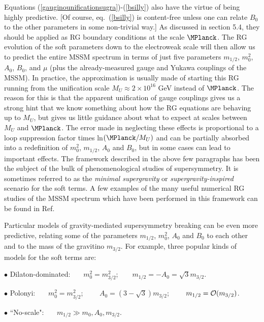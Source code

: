 Equations (\ref{gauginounificationsugra})-(\ref{bsilly})
also have the virtue of being highly predictive. [Of course,
eq.~(\ref{bsilly}) is content-free unless one can relate
$B_0$ to the other parameters in some non-trivial way.]
As discussed in section 5.4, they should be applied as RG boundary
conditions at the
scale $\MPlanck$. The RG evolution of the soft parameters
down to the electroweak scale
will then allow us to predict the entire MSSM
spectrum in terms
of just five parameters $m_{1/2}$, $m_0^2$, $A_0$, $B_0$, and
$\mu$ (plus the already-measured gauge and Yukawa couplings of the MSSM).
In practice, the approximation is usually made
of starting this RG running from
the unification scale $M_U\approx 2\times 10^{16}$ GeV
instead of $\MPlanck$. The reason for this
is that the apparent unification of gauge couplings
gives us a strong hint that we know something about how the RG equations
are behaving up to $M_U$, but gives us little guidance
about what to expect at scales between $M_U$ and $\MPlanck$.
The error made in neglecting these effects is proportional
to a loop suppression factor times ln$(\MPlanck/M_U)$ and can be
partially absorbed
into a redefinition of $m_0^2$, $m_{1/2}$, $A_0$ and $B_0$,
but in some cases can lead to
important effects.\cite{PP}
The framework described in the above few paragraphs
has been the subject of
the bulk of phenomenological
studies of supersymmetry. It is sometimes referred to as the
{\it minimal supergravity} or {\it supergravity-inspired}
scenario for the soft terms. A few examples of the many useful numerical
RG studies of the MSSM spectrum which have been
performed in this framework can be
found in
Ref.\cite{samplespectra}

Particular models of gravity-mediated
supersymmetry breaking can be even more
predictive,
relating some of the parameters $m_{1/2}$, $m_0^2$, $A_0$ and $B_0$ to
each other and to the mass of the gravitino $m_{3/2}$.
For example, three popular
kinds of models for the soft terms are:
\vspace{.05in}

\noindent $\bullet$
Dilaton-dominated: \cite{dilatondominated}~~~$m^2_0 =
m^2_{3/2}$;~~~~$m_{1/2} = -A_0 = {\sqrt 3} m_{3/2}$.
\vspace{.05in}

\noindent $\bullet$
Polonyi: \cite{polonyi}
{}~~~$m^2_0 = m^2_{3/2}$;
{}~~~~$A_0 = (3 -{\sqrt 3}) m_{3/2}$;
{}~~~~$m_{1/2} = {\cal O}(m_{3/2})$.
\vspace{.05in}

\noindent $\bullet$ ``No-scale": \cite{noscale}~~~$m_{1/2} \gg
m_0, A_0, m_{3/2}$.
\vspace{.05in}

